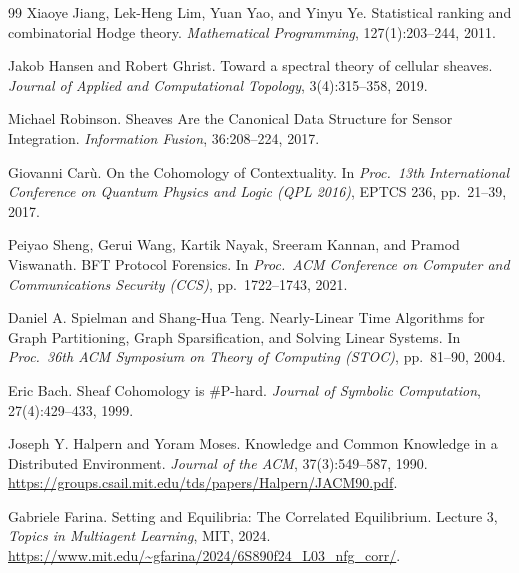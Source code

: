 \documentclass[11pt,a4paper]{article}
\theoremstyle{definition}
\theoremstyle{remark}
\begin{document}
\begin{thebibliography}{99}
Xiaoye Jiang, Lek-Heng Lim, Yuan Yao, and Yinyu Ye.
\newblock Statistical ranking and combinatorial Hodge theory.
\newblock \textit{Mathematical Programming}, 127(1):203--244, 2011.

Jakob Hansen and Robert Ghrist.
\newblock Toward a spectral theory of cellular sheaves.
\newblock \textit{Journal of Applied and Computational Topology}, 3(4):315--358, 2019.

Michael Robinson.
\newblock Sheaves Are the Canonical Data Structure for Sensor Integration.
\newblock \textit{Information Fusion}, 36:208--224, 2017.

Giovanni Car\`u.
\newblock On the Cohomology of Contextuality.
\newblock In \textit{Proc.\ 13th International Conference on Quantum Physics and Logic (QPL 2016)}, EPTCS 236, pp.~21--39, 2017.

Peiyao Sheng, Gerui Wang, Kartik Nayak, Sreeram Kannan, and Pramod Viswanath.
\newblock BFT Protocol Forensics.
\newblock In \textit{Proc.\ ACM Conference on Computer and Communications Security (CCS)}, pp.~1722--1743, 2021.

Daniel A. Spielman and Shang-Hua Teng.
\newblock Nearly-Linear Time Algorithms for Graph Partitioning, Graph Sparsification, and Solving Linear Systems.
\newblock In \textit{Proc.\ 36th ACM Symposium on Theory of Computing (STOC)}, pp.~81--90, 2004.

Eric Bach.
\newblock Sheaf Cohomology is \#P-hard.
\newblock \textit{Journal of Symbolic Computation}, 27(4):429--433, 1999.

Joseph Y. Halpern and Yoram Moses.
\newblock Knowledge and Common Knowledge in a Distributed Environment.
\newblock \emph{Journal of the ACM}, 37(3):549--587, 1990.
\newblock \url{https://groups.csail.mit.edu/tds/papers/Halpern/JACM90.pdf}.

Gabriele Farina.
\newblock Setting and Equilibria: The Correlated Equilibrium.
\newblock Lecture 3, \emph{Topics in Multiagent Learning}, MIT, 2024.
\newblock \url{https://www.mit.edu/~gfarina/2024/6S890f24_L03_nfg_corr/}.

\end{thebibliography}

\appendix
\end{document}
